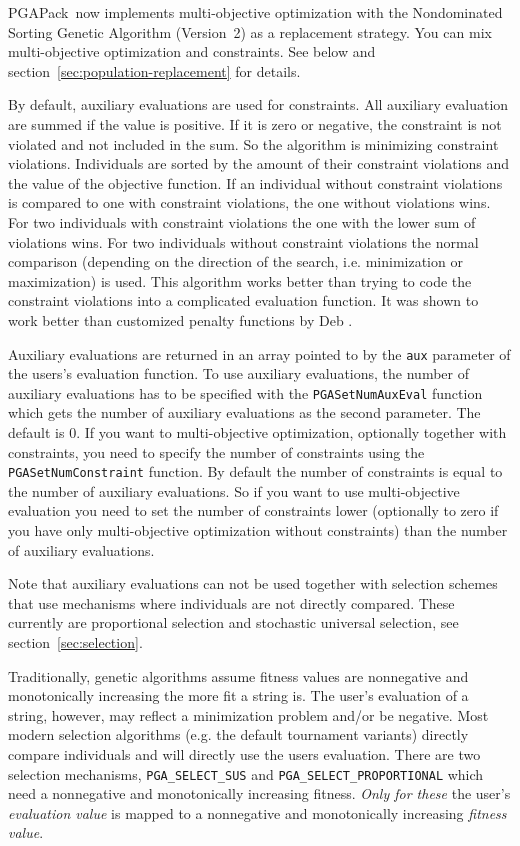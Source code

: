 \documentclass{report}
\newcommand{\pga}{PGAPack}
\begin{document}
\pga\ now implements multi-objective optimization with the Nondominated
Sorting Genetic Algorithm (Version~2) \cite{DPAM02} as a replacement
strategy. You can mix multi-objective optimization and constraints.
See below and section~\ref{sec:population-replacement} for details.

By default, auxiliary evaluations are used for constraints. All
auxiliary evaluation are summed if the value is positive. If it is zero
or negative, the constraint is not violated and not included in the sum.
So the algorithm is
minimizing constraint violations.  Individuals are sorted by the amount
of their constraint violations and the value of the objective function.
If an individual without constraint violations is compared to one with
constraint violations, the one without violations wins. For two
individuals with constraint violations the one with the lower sum of
violations wins. For two individuals without constraint violations the
normal comparison (depending on the direction of the search, i.e.
minimization or maximization) is used. This algorithm works better than
trying to code the constraint violations into a complicated evaluation
function. It was shown to work better than customized penalty functions
by Deb \cite{Deb00}.

Auxiliary evaluations are returned in an array pointed to by the \verb+aux+
parameter of the users's evaluation function. To use auxiliary
evaluations, the number of auxiliary evaluations has to be specified
with the \verb+PGASetNumAuxEval+ function which gets the number of
auxiliary evaluations as the second parameter. The default is 0.
If you want to multi-objective optimization, optionally together with
constraints, you need to specify the number of constraints using the
\verb+PGASetNumConstraint+ function. By default the number of
constraints is equal to the number of auxiliary evaluations. So if you
want to use multi-objective evaluation you need to set the number of
constraints lower (optionally to zero if you have only multi-objective
optimization without constraints) than the number of auxiliary
evaluations.

Note that auxiliary evaluations can not be used together with selection
schemes that use mechanisms where individuals are not directly compared.
These currently are proportional selection and stochastic universal
selection, see section~\ref{sec:selection}.

Traditionally, genetic algorithms assume fitness values are nonnegative and
monotonically increasing the more fit a string is.  The user's evaluation of a
string, however, may reflect a minimization problem and/or be negative.
Most modern selection algorithms (e.g. the default tournament variants)
directly compare individuals and will directly use the users evaluation.
There are two selection mechanisms, \verb+PGA_SELECT_SUS+ and
\verb+PGA_SELECT_PROPORTIONAL+ which need a nonnegative and
monotonically increasing fitness. \textit{Only for these}
the user's {\em evaluation value} is mapped to a nonnegative and
monotonically increasing {\em fitness value}.
\end{document}
